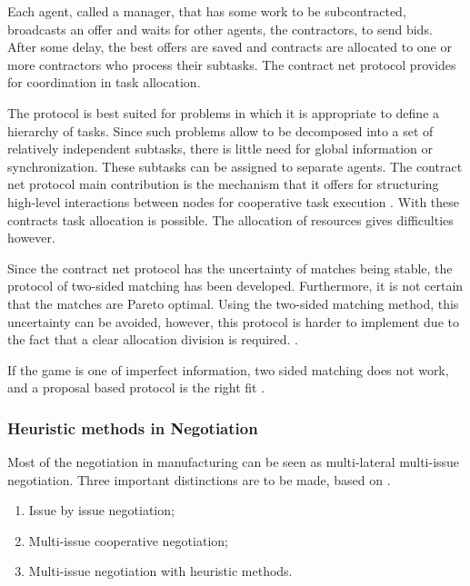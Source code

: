 Each agent, called a manager, that has some work to be subcontracted, broadcasts an offer and waits for other agents, the contractors, to send bids. After some delay, the best offers are saved and contracts are allocated to one or more contractors who process their subtasks. The contract net protocol provides for coordination in task allocation. 

The protocol is best suited for problems in which it is appropriate to define a hierarchy of tasks. Since such problems allow to be decomposed into a set of relatively independent subtasks, there is little need for global information or synchronization. These subtasks can be assigned to separate agents. The contract net protocol main contribution is the mechanism that it offers for structuring high-level interactions between nodes for cooperative task execution \citep{smith1980communication}. With these contracts task allocation is possible. The allocation of resources gives difficulties however. 

Since the contract net protocol has the uncertainty of matches being stable, the protocol of two-sided matching has been developed. Furthermore, it is not certain that the matches are Pareto optimal. Using the two-sided matching method, this uncertainty can be avoided, however, this protocol is harder to implement due to the fact that a clear allocation division is required. \citep{fatima2014principles}.
 
If the game is one of imperfect information, two sided matching does not work, and a proposal based protocol is the right fit \citep{rahwan2003argumentation}.


\subsubsection{Heuristic methods in Negotiation}
\label{sec:lit:learn}
Most of the negotiation in manufacturing can be seen as multi-lateral multi-issue negotiation. Three important distinctions are to be made, based on \citet{lai2004literature}. 
\begin{enumerate}
	\item
	Issue by issue negotiation;
	\item
	Multi-issue cooperative negotiation;
	\item
	Multi-issue negotiation with heuristic methods.
	\end{enumerate}
	
